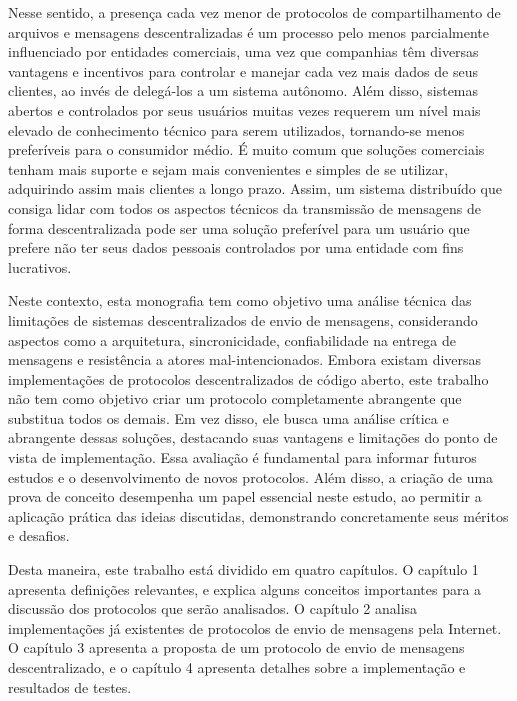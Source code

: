 Nesse sentido, a presença cada vez menor de protocolos de compartilhamento de arquivos e mensagens descentralizadas é um processo pelo menos parcialmente influenciado por entidades comerciais, uma vez que companhias têm diversas vantagens e incentivos para controlar e manejar cada vez mais dados de seus clientes, ao invés de delegá-los a um sistema autônomo. Além disso, sistemas abertos e controlados por seus usuários muitas vezes requerem um nível mais elevado de conhecimento técnico para serem utilizados, tornando-se menos preferíveis para o consumidor médio. É muito comum que soluções comerciais tenham mais suporte e sejam mais convenientes e simples de se utilizar, adquirindo assim mais clientes a longo prazo. Assim, um sistema distribuído que consiga lidar com todos os aspectos técnicos da transmissão de mensagens de forma descentralizada pode ser uma solução preferível para um usuário que prefere não ter seus dados pessoais controlados por uma entidade com fins lucrativos. 

Neste contexto, esta monografia tem como objetivo uma análise técnica das limitações de sistemas descentralizados de envio de mensagens, considerando aspectos como a arquitetura, sincronicidade, confiabilidade na entrega de mensagens e resistência a atores mal-intencionados. Embora existam diversas implementações de protocolos descentralizados de código aberto, este trabalho não tem como objetivo criar um protocolo completamente abrangente que substitua todos os demais. Em vez disso, ele busca uma análise crítica e abrangente dessas soluções, destacando suas vantagens e limitações do ponto de vista de implementação. Essa avaliação é fundamental para informar futuros estudos e o desenvolvimento de novos protocolos. Além disso, a criação de uma prova de conceito desempenha um papel essencial neste estudo, ao permitir a aplicação prática das ideias discutidas, demonstrando concretamente seus méritos e desafios.

Desta maneira, este trabalho está dividido em quatro capítulos. O capítulo 1 apresenta definições relevantes, e explica alguns conceitos importantes para a discussão dos protocolos que serão analisados. O capítulo 2 analisa implementações já existentes de protocolos de envio de mensagens pela Internet. O capítulo 3 apresenta a proposta de um protocolo de envio de mensagens descentralizado, e o capítulo 4 apresenta detalhes sobre a implementação e resultados de testes.